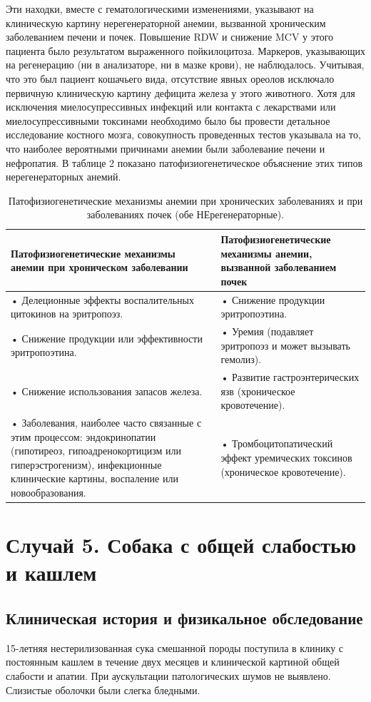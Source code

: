\documentclass[a4paper,12pt]{book}
\begin{document}
Эти находки, вместе с гематологическими изменениями, указывают на клиническую картину нерегенераторной анемии, вызванной хроническим заболеванием печени и почек. Повышение RDW и снижение MCV у этого пациента было результатом выраженного пойкилоцитоза. Маркеров, указывающих на регенерацию (ни в анализаторе, ни в мазке крови), не наблюдалось. Учитывая, что это был пациент кошачьего вида, отсутствие явных ореолов исключало первичную клиническую картину дефицита железа у этого животного. Хотя для исключения миелосупрессивных инфекций или контакта с лекарствами или миелосупрессивными токсинами необходимо было бы провести детальное исследование костного мозга, совокупность проведенных тестов указывала на то, что наиболее вероятными причинами анемии были заболевание печени и нефропатия. В таблице 2 показано патофизиогенетическое объяснение этих типов нерегенераторных анемий.

\begin{table}[htbp]
\centering
\caption{Патофизиогенетические механизмы анемии при хронических заболеваниях и при заболеваниях почек (обе НЕрегенераторные).}
\begin{tabular}{p{7cm}p{7cm}}
\toprule
Патофизиогенетические механизмы анемии при хроническом заболевании & Патофизиогенетические механизмы анемии, вызванной заболеванием почек \\
\midrule
• Делеционные эффекты воспалительных цитокинов на эритропоэз. & • Снижение продукции эритропоэтина. \\
• Снижение продукции или эффективности эритропоэтина. & • Уремия (подавляет эритропоэз и может вызывать гемолиз). \\
• Снижение использования запасов железа. & • Развитие гастроэнтерических язв (хроническое кровотечение). \\
• Заболевания, наиболее часто связанные с этим процессом: эндокринопатии (гипотиреоз, гипоадренокортицизм или гиперэстрогенизм), инфекционные клинические картины, воспаление или новообразования. & • Тромбоцитопатический эффект уремических токсинов (хроническое кровотечение). \\
\bottomrule
\end{tabular}
\end{table}

\section{Случай 5. Собака с общей слабостью и кашлем}
\subsection*{Клиническая история и физикальное обследование}
15-летняя нестерилизованная сука смешанной породы поступила в клинику с постоянным кашлем в течение двух месяцев и клинической картиной общей слабости и апатии. При аускультации патологических шумов не выявлено. Слизистые оболочки были слегка бледными.
\end{document}
